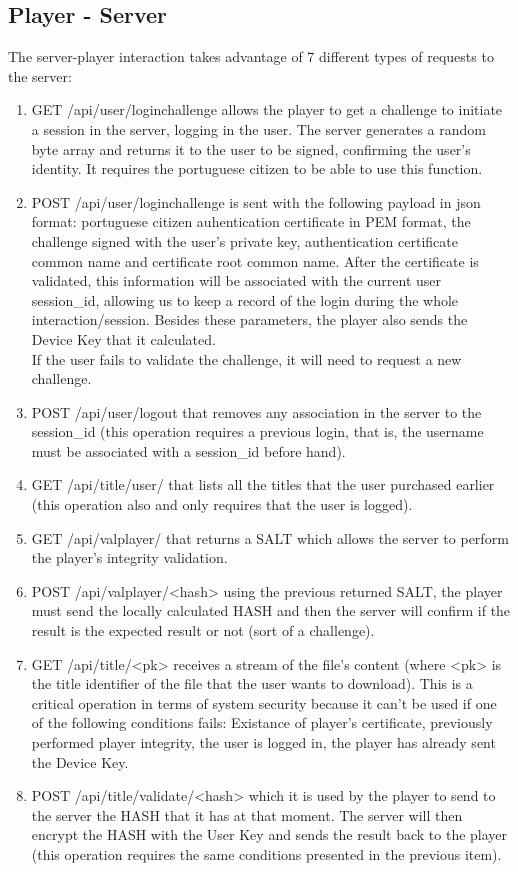 \documentclass[11pt,a4paper]{report}
\begin{document}
\subsection{Player - Server}
The server-player interaction takes advantage of 7 different types of requests to the server:
\begin{enumerate}
\item GET /api/user/loginchallenge allows the player to get a challenge to initiate a session in the server, logging in the user. The server generates a random byte array and returns it to the user to be signed, confirming the user's identity. It requires the portuguese citizen to be able to use this function.
\item POST  /api/user/loginchallenge is sent with the following payload in json format: portuguese citizen auhentication certificate in PEM format, the challenge signed with the user's private key, authentication certificate common name and certificate root common name. 
    After the certificate is validated, this information will be associated with the current user session\_id, allowing us to keep a record of the login during the whole interaction/session. Besides these parameters, the player also sends the Device Key that it calculated.\\
    If the user fails to validate the challenge, it will need to request a new challenge.
\item POST  /api/user/logout that removes any association in the server to the session\_id (this operation requires a previous login, that is, the username must be associated with a session\_id before hand).
\item GET   /api/title/user/ that lists all the titles that the user purchased earlier (this operation also and only requires that the user is logged).
\item GET   /api/valplayer/ that returns a SALT which allows the server to perform the player's integrity validation.
\item POST  /api/valplayer/<hash> using the previous returned SALT, the player must send the locally calculated HASH and then the server will confirm if the result is the expected result or not (sort of a challenge).
\item GET   /api/title/<pk> receives a stream of the file's content (where <pk> is the title identifier of the file that the user wants to download). This is a critical operation in terms of system security because it can't be used if one of the following conditions fails: Existance of player's certificate, previously performed player integrity, the user is logged in, the player has already sent the Device Key.
\item POST  /api/title/validate/<hash> which it is used by the player to send to the server the HASH that it has at that moment. The server will then encrypt the HASH with the User Key and sends the result back to the player (this operation requires the same conditions presented in the previous item).
\end{enumerate}
\end{document}
